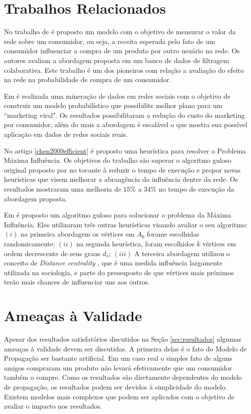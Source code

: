 \documentclass[12pt]{article}
\begin{document}
\section{Trabalhos Relacionados}
\label{sec:trab_relacionados}

No trabalho de \cite{domingos2001mining} é proposto um modelo com o objetivo de mensurar o valor da rede sobre um consumidor, ou seja, a receita esperada pelo fato de um consumidor influenciar a compra de um produto por outro usuário na rede. Os autores avaliam a abordagem proposta em um banco de dados de filtragem colaborativa. Este trabalho é um dos pioneiros com relação a avaliação do efeito na rede na probabilidade de compra de um consumidor. 

Em \cite{richardson2002mining} é realizada uma mineração de dados em redes sociais com o objetivo de construir um modelo probabilístico que possibilite melhor plano para um ``marketing viral"{}. Os resultados possibilitaram a redução do custo do marketing por consumidor, além do mais a abordagem é escalável o que mostra sua possível aplicação em dados de redes sociais reais.

No artigo \ref{chen2009efficient} é proposto uma heurística para resolver o Problema Máxima Influência. Os objetivos do trabalho são superar o algoritmo guloso original proposto por \cite{kempe2003maximizing} no tocante à reduzir o tempo de execução e propor novas heurísticas que visem melhorar a abrangência da influência dentre da rede. Os resultados mostraram uma melhoria de $15\%$ a $34\%$ no tempo de execução da abordagem proposta. 

Em \cite{kempe2003maximizing} é proposto um algoritmo guloso para solucionar o problema da Máxima Influência. Eles utilizaram três outras heurísticas visando avaliar o seu algoritmo: $(i)$ na primeira abordagem os vértices em $A_{0}$ forame escolhidas randomicamente; $(ii)$ na segunda heurística, foram escolhidos $k$ vértices em ordem decrescente de seus graus $d_{v}$; $(iii)$ A terceira abordagem utilizou o conceito de \textit{Distance centrality} \cite{scott2012social}, que é uma  medida influência largamente utilizada na sociologia, e parte do pressuposto de que vértices mais próximos terão mais chances de influenciar uns aos outros.

\section{Ameaças à Validade}
\label{sec:ameacas}
		
Apesar dos resultados satisfatórios discutidos na Seção \ref{sec:resultados} algumas ameaças à validade devem ser discutidas. A primeira delas é o fato do Modelo de Propagação ser bastante artificial. Em um caso real o simples fato de alguns amigos compraram um produto não levará efetivamente que um consumidor também o compre. Como os resultados são diretamente dependentes do modelo de propagação, os resultados podem ser devidos à simplicidade do modelo. Existem modelos mais complexos \cite{goldenberg2001talk,goldenberg2001using}{} que podem ser aplicados com o objetivo de avaliar o impacto nos resultados.
\end{document}
